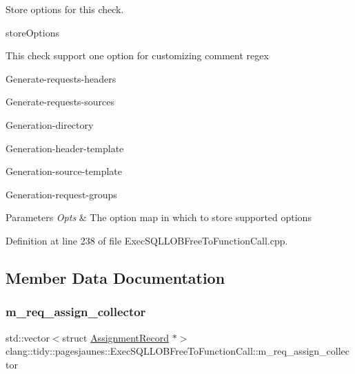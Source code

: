 Store options for this check. 

store\+Options

This check support one option for customizing comment regex
\begin{DoxyItemize}
\item Generate-\/requests-\/headers
\item Generate-\/requests-\/sources
\item Generation-\/directory
\item Generation-\/header-\/template
\item Generation-\/source-\/template
\item Generation-\/request-\/groups
\end{DoxyItemize}


\begin{DoxyParams}{Parameters}
{\em Opts} & The option map in which to store supported options \\
\hline
\end{DoxyParams}


Definition at line 238 of file Exec\+S\+Q\+L\+L\+O\+B\+Free\+To\+Function\+Call.\+cpp.



\subsection{Member Data Documentation}
\mbox{\label{classclang_1_1tidy_1_1pagesjaunes_1_1_exec_s_q_l_l_o_b_free_to_function_call_a2b2cacf13fc355e116e846a410c13e1a}} 
\subsubsection{\texorpdfstring{m\+\_\+req\+\_\+assign\+\_\+collector}{m\_req\_assign\_collector}}
{\footnotesize\ttfamily std\+::vector$<$struct \hyperlink{structclang_1_1tidy_1_1pagesjaunes_1_1_exec_s_q_l_l_o_b_free_to_function_call_1_1_assignment_record}{Assignment\+Record} $\ast$$>$ clang\+::tidy\+::pagesjaunes\+::\+Exec\+S\+Q\+L\+L\+O\+B\+Free\+To\+Function\+Call\+::m\+\_\+req\+\_\+assign\+\_\+collector\hspace{0.3cm}{\ttfamily [protected]}}



